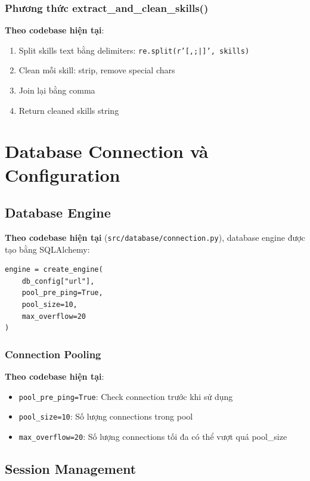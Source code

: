 \subsubsection{Phương thức extract\_and\_clean\_skills()}

\textbf{Theo codebase hiện tại}:
\begin{enumerate}
    \item Split skills text bằng delimiters: \texttt{re.split(r'[,;|]', skills)}
    \item Clean mỗi skill: strip, remove special chars
    \item Join lại bằng comma
    \item Return cleaned skills string
\end{enumerate}

\section{Database Connection và Configuration}

\subsection{Database Engine}

\textbf{Theo codebase hiện tại} (\texttt{src/database/connection.py}), database engine được tạo bằng SQLAlchemy:

\begin{verbatim}
engine = create_engine(
    db_config["url"],
    pool_pre_ping=True,
    pool_size=10,
    max_overflow=20
)
\end{verbatim}

\subsubsection{Connection Pooling}

\textbf{Theo codebase hiện tại}:
\begin{itemize}
    \item \texttt{pool\_pre\_ping=True}: Check connection trước khi sử dụng
    \item \texttt{pool\_size=10}: Số lượng connections trong pool
    \item \texttt{max\_overflow=20}: Số lượng connections tối đa có thể vượt quá pool\_size
\end{itemize}

\subsection{Session Management}


